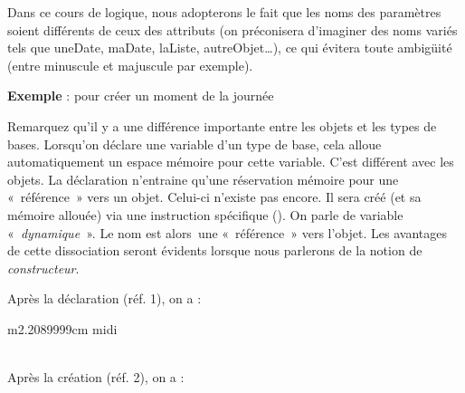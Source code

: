 
Dans ce cours de logique, nous adopterons le fait que 
les noms des paramètres soient différents de ceux des 
attributs (on préconisera d’imaginer des noms variés tels 
que uneDate, maDate, laListe, autreObjet…), ce qui évitera 
toute ambigüité (entre minuscule et majuscule par exemple).


{
\textbf{Exemple} : pour créer un moment de la journée}


Remarquez qu'il y a une différence importante entre les
objets et les types de bases. Lorsqu'on déclare une
variable d'un type de base, cela alloue
automatiquement un espace mémoire pour cette variable.
C'est différent avec les objets. La déclaration
n'entraine qu'une réservation mémoire
pour une «~référence~» vers un objet. Celui-ci
n'existe pas encore. Il sera créé (et sa mémoire
allouée) via une instruction spécifique (). On
parle de variable «\textit{~dynamique~}». Le nom est alors~une
«~référence~» vers l’objet. Les avantages de cette dissociation seront
évidents lorsque nous parlerons de la notion de \textit{constructeur}.

Après la déclaration (réf. 1), on a :

\begin{center}
\tablehead{}
\begin{supertabular}{m{2.2089999cm}}
\centering\arraybslash  midi\\\hline
{}\\\hline
\end{supertabular}
\end{center}

\clearpage
Après la création (réf. 2), on a :

